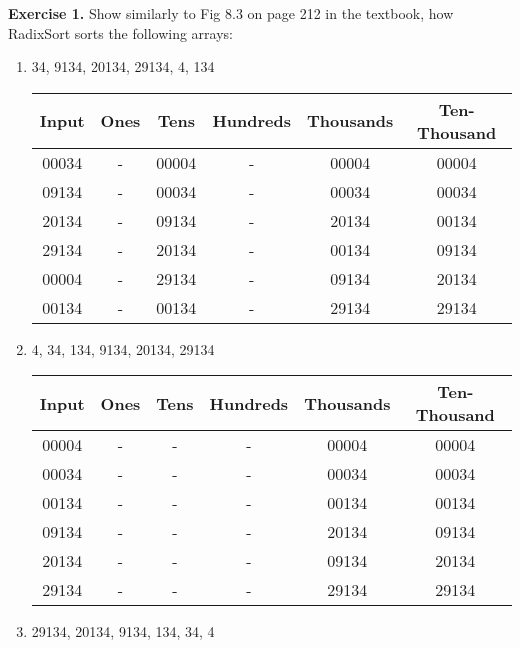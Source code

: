\documentclass[11pt]{article}
\begin{document}

\textbf{Exercise 1.} Show similarly to Fig 8.3 on page 212 in the textbook, how \textsf{RadixSort} sorts the following arrays:

\begin{enumerate}

\item 34, 9134, 20134, 29134, 4, 134


\begin{center}
\begin{tabular}{|c c c c c c |} 
 \hline
 Input & Ones & Tens & Hundreds & Thousands & Ten-Thousand \\ 
 \hline\hline
 00034 & - & 00004 & - &   00004 &  00004 \\ 
\hline
 09134 & - & 00034 &  - & 00034 & 00034\\ 
 \hline
 20134 & - & 09134  & - & 20134 & 00134 \\ 
 \hline
 29134 & - & 20134  & - &  00134 & 09134  \\ 
 \hline
 00004 & - & 29134 &  - & 09134 &  20134  \\ 
  \hline
  00134 & - & 00134  &  - &  29134 &  29134\\ 
  \hline
\end{tabular}
\end{center}


\item 4, 34, 134, 9134, 20134, 29134


\begin{center}
    
\begin{tabular}{|c c c c c c |} 
 \hline
 Input & Ones & Tens & Hundreds & Thousands & Ten-Thousand \\ 
 \hline\hline
 00004 & - & - & - &    00004 &  00004  \\ 
\hline
 00034 & - & - &  - & 00034 & 00034 \\ 
 \hline
 00134  & - & -  & - &  00134  &  00134  \\ 
 \hline
 09134 & - & -  & - &  20134 & 09134 \\ 
 \hline
 20134 & - & - &  - & 09134 &  20134  \\ 
  \hline
  29134 & - & -  &  - &  29134 &  29134 \\ 
  \hline
\end{tabular}
\end{center}


\item 29134, 20134, 9134, 134, 34, 4


\end{enumerate}
\end{document}
